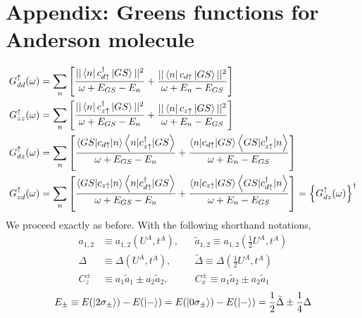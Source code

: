 \documentclass[12pt]{article}
\numberwithin{equation}{section}
\begin{document}
\section*{Appendix: Greens functions for Anderson molecule}
\begin{equation}\begin{aligned}
	G_{dd}^\uparrow(\omega) &= \sum_{n}\left[\frac{||\bra{n}c^\dagger_{d\uparrow}\ket{GS}||^2}{\omega + E_{GS} - E_n} + \frac{||\bra{n}c_{d\uparrow}\ket{GS}||^2}{\omega + E_n - E_{GS}}\right]\\
	G_{zz}^\uparrow(\omega)&= \sum_{n}\left[\frac{||\bra{n}c^\dagger_{z\uparrow}\ket{GS}||^2}{\omega + E_{GS} - E_n} + \frac{||\bra{n}c_{z\uparrow}\ket{GS}||^2}{\omega + E_n - E_{GS}}\right]\\
	G_{dz}^\uparrow(\omega)	&= \sum_{n}\left[\frac{\left<GS|c_{d\uparrow} | n \right>\left<n |c^\dagger_{z \uparrow} |GS\right>}{\omega + E_{GS} - E_n} + \frac{\left<n|c_{d\uparrow} | GS\right>\left<GS |c^\dagger_{z \uparrow} |n\right>}{\omega + E_{n} - E_{GS}}\right]\\
	G_{zd}^\uparrow(\omega) &= \sum_{n}\left[\frac{\left<GS|c_{z \uparrow} | n \right>\left<n |c^\dagger_{d \uparrow} |GS\right>}{\omega + E_{GS} - E_n} + \frac{\left<n|c_{z \uparrow} | GS\right>\left<GS |c^\dagger_{d \uparrow} | n\right>}{\omega + E_{n} - E_{GS}}\right] = \left\{G_{dz}^\uparrow(\omega)\right\}^\dagger\\
\end{aligned}\end{equation}
We proceed exactly as before. With the following shorthand notations,
\begin{equation}\begin{aligned}
	a_{1,2} &\equiv a_{1,2}\left(U^A, t^A\right), &&\tilde a_{1,2} \equiv a_{1,2}\left(\frac{1}{2}U^A, t^A\right) \\
	\Delta &\equiv \Delta\left(U^A, t^A\right), &&\tilde \Delta \equiv \Delta\left(\frac{1}{2}U^A, t^A\right)\\
	C_z^\pm &\equiv a_1 \tilde a_1 \pm a_2 \tilde a_2, &&C_x^\pm \equiv a_1 \tilde a_2 \pm a_2 \tilde a_1
\end{aligned}\end{equation}
\begin{equation}\begin{aligned}
	E_{\pm} \equiv E(\ket{2\sigma_\pm}) - E(\ket{-}) = E(\ket{0\sigma_\pm}) - E(\ket{-}) = \frac{1}{2}\tilde\Delta \pm \frac{1}{4}\Delta\\
\end{aligned}\end{equation}
\end{document}

